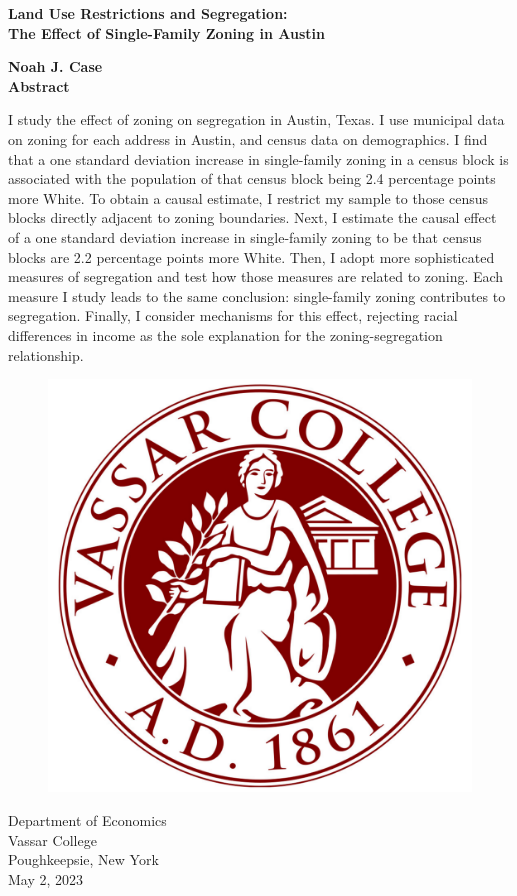 \documentclass[11pt]{article}
\begin{document}
\begin{titlepage}
\setcounter{page}{1}
\begin{center}
\vspace{1cm}
\LARGE
\textbf{Land Use Restrictions and Segregation:\\ The Effect of Single-Family Zoning in Austin}

\Large
\vspace{.5cm}
\vspace{.5cm}
\textbf{Noah J. Case}\\
\vspace{.5cm}
\Large
\vspace{.5cm}
\large
\textbf{Abstract}
\end{center}

\begin{singlespace}
\noindent
I study the effect of zoning on segregation in Austin, Texas. I use municipal data on zoning for each address in Austin, and census data on demographics. I find that a one standard deviation increase in single-family zoning in a census block is associated with the population of that census block being 2.4 percentage points more White. To obtain a causal estimate, I restrict my sample to those census blocks directly adjacent to zoning boundaries. Next, I estimate the causal effect of a one standard deviation increase in single-family zoning to be that census blocks are 2.2 percentage points more White. Then, I adopt more sophisticated measures of segregation and test how those measures are related to zoning. Each measure I study leads to the same conclusion: single-family zoning contributes to segregation. Finally, I consider mechanisms for this effect, rejecting racial differences in income as the sole explanation for the zoning-segregation relationship.

\end{singlespace}
\vspace{0.4in}

\begin{figure}[H]
 \begin{center}
 \includegraphics[width = .4\textwidth]{Vassar_Seal.pdf}
 \end{center}
 \end{figure}



\begin{center}	
Department of Economics\\
Vassar College\\
Poughkeepsie, New York\\
May 2, 2023\\
\end{center}
\end{titlepage}
\end{document}
